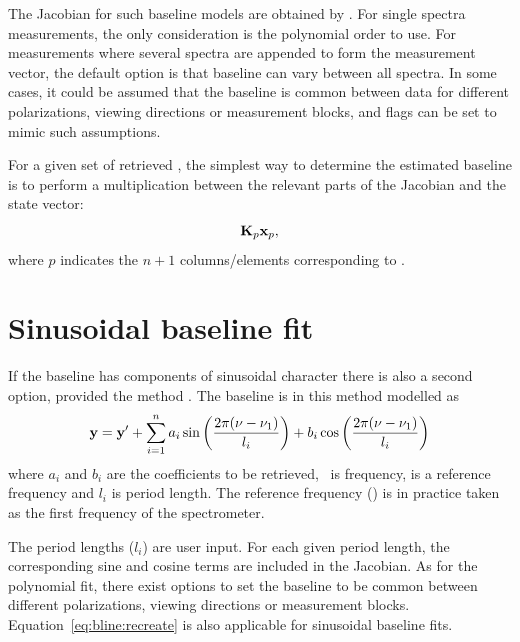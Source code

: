 The Jacobian for such baseline models are obtained by
. For single spectra measurements, the only
consideration is the polynomial order to use. For measurements where several
spectra are appended to form the measurement vector, the default option is that
baseline can vary between all spectra. In some cases, it could be assumed that
the baseline is common between data for different polarizations, viewing
directions or measurement blocks, and flags can be set to mimic such
assumptions.

For a given set of retrieved , the simplest way to determine the
estimated baseline is to perform a multiplication between the relevant parts of
the Jacobian and the state vector:
\begin{equation}
  \mathbf{K}_{p}\mathbf{x}_{p},
  \label{eq:bline:recreate}
\end{equation}
where $p$ indicates the $n+1$ columns/elements corresponding to .


\section{Sinusoidal baseline fit}
\label{sec:wfuns:sinefit}

If the baseline has components of sinusoidal character there is also a second
option, provided the method . The baseline is
in this method modelled as \citep{kuntz:97}
\begin{equation}
  \label{eq:sinefit}
  \mathbf{y} = \mathbf{y}' + \sum_{i=1}^n 
       a_i\sin\left(\frac{2\pi(\nu-\nu_{1})}{l_i}\right)+
       b_i\cos\left(\frac{2\pi(\nu-\nu_{1})}{l_i}\right)
\end{equation}
where $a_i$ and $b_i$ are the coefficients to be retrieved, \Frq\ is frequency,
 is a reference frequency and $l_i$ is period length. The reference
frequency () is in practice taken as the first frequency of the
spectrometer. 

The period lengths ($l_i$) are user input. For each given period length, the
corresponding sine and cosine terms are included in the Jacobian. As for the
polynomial fit, there exist options to set the baseline to be common between
different polarizations, viewing directions or measurement blocks.
Equation~\ref{eq:bline:recreate} is also applicable for sinusoidal baseline
fits.


